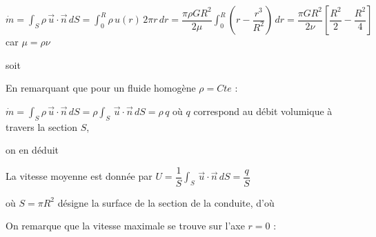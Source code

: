 \documentclass[10pt, a4paper]{article}
\renewcommand{\myvec}[1]{\vec{#1}}
\begin{document}
\begin{myenumerate}
	\medskip
	$\displaystyle \dot{m} = \int_S \rho \, \myvec{u} \cdot \myvec{n} \, dS = \int_0^R \rho \, u(r) \, 2\pi r\, dr
	= \dfrac{\pi \rho GR^2}{2\mu} \int_0^R \left ( r - \dfrac{r^3}{R^2} \right ) \, dr
	= \dfrac{\pi GR^2}{2\nu} \left [ \dfrac{R^2}{2} - \dfrac{R^2}{4} \right ]$ car $\mu = \rho \nu$
	
	\medskip
	soit \dotfill {}
	
	\medskip
	En remarquant que pour un fluide homogène $\rho = Cte$ :
	
	$\displaystyle \dot{m} = \int_S \rho \, \myvec{u} \cdot \myvec{n} \, dS 
	= \rho \int_S \, \myvec{u} \cdot \myvec{n} \, dS = \rho \, q$
	où $q$ correspond au débit volumique à travers la section $S$,
	
	on en déduit
	\dotfill
	
	\medskip
	La vitesse moyenne est donnée par $\displaystyle U = \dfrac{1}{S} \int_S \, \myvec{u} \cdot \myvec{n} \, dS 
	= \dfrac{q}{S}$
	
	où $S = \pi R^2$ désigne la surface de la section de la conduite, d'où
	\dotfill
	
	\medskip
	On remarque que la vitesse maximale se trouve sur l'axe $r=0$ : \hfill
\end{myenumerate}
\end{document}

